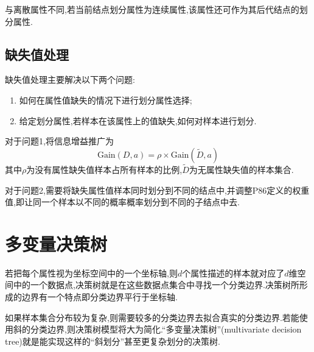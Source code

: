 与离散属性不同,若当前结点划分属性为连续属性,该属性还可作为其后代结点的划分属性.

\subsection{缺失值处理}

缺失值处理主要解决以下两个问题:

\begin{enumerate}
\item 如何在属性值缺失的情况下进行划分属性选择;
\item 给定划分属性,若样本在该属性上的值缺失,如何对样本进行划分.
\end{enumerate}

对于问题1,将信息增益推广为
\begin{equation}
\text{Gain}(D,a)=\rho\times\text{Gain}(\tilde D,a)
\end{equation}
其中$\rho$为没有属性缺失值样本占所有样本的比例,$\tilde D$为无属性缺失值的样本集合.

对于问题2,需要将缺失属性值样本同时划分到不同的结点中,并调整P86定义的权重值,即让同一个样本以不同的概率概率划分到不同的子结点中去.

\section{多变量决策树}

若把每个属性视为坐标空间中的一个坐标轴,则$d$个属性描述的样本就对应了$d$维空间中的一个数据点,决策树就是在这些数据点集合中寻找一个分类边界.决策树所形成的边界有一个特点即分类边界平行于坐标轴.

如果样本集合分布较为复杂,则需要较多的分类边界去拟合真实的分类边界.若能使用斜的分类边界,则决策树模型将大为简化.``多变量决策树''(multivariate decision tree)就是能实现这样的``斜划分''甚至更复杂划分的决策树.